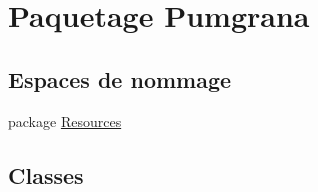 \hypertarget{namespace_pumgrana}{\section{Paquetage Pumgrana}
\label{namespace_pumgrana}
}
\subsection*{Espaces de nommage}
\begin{DoxyCompactItemize}
\item 
package \hyperlink{namespace_pumgrana_1_1_resources}{Resources}
\end{DoxyCompactItemize}
\subsection*{Classes}
